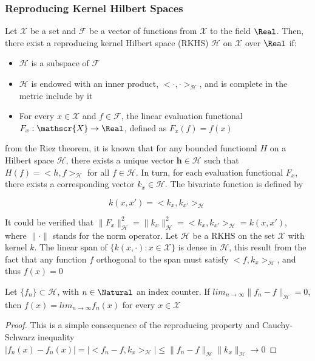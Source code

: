 \subsubsection{Reproducing Kernel Hilbert Spaces}

Let $\mathscr{X}$ be a set and $\mathscr{F}$ be a vector of functions from $\mathscr{X}$ to the field $\Real$. Then, there exist a reproducing kernel Hilbert space (RKHS) $\mathscr{H}$ on $\mathscr{X}$ over $\Real$ if:
\begin{itemize}
    \item $\mathscr{H}$ is a subspace of $\mathscr{F}$
    \item $\mathscr{H}$ is endowed with an inner product, $<\cdot,\cdot>_{\mathscr{H}}$, and is complete in the metric include by it
    \item For every $x \in \mathscr{X}$ and $f \in \mathscr{F}$, the linear evaluation functional $F_x:\mathscr{X} \rightarrow \Real$, defined as $F_x(f) = f(x)$
\end{itemize}

from the Riez theorem, it is known that for any bounded functional $H$ on a Hilbert space $\mathscr{H}$, there exists a unique vector $\mathbf{h} \in \mathscr{H}$ such that $H(f) = <h,f>_{\mathscr{H}}$ for all $f \in \mathscr{H}$. In turn, for each evaluation functional $F_x$, there exists a corresponding vector $k_x \in \mathscr{H}$. The bivariate function is defined by

\begin{equation}
    k(x,x') = <k_x,k_{x'}>_{\mathscr{H}}
\end{equation}

It could be verified that $\|F_x\|_{\mathscr{H}}^2 = \|k_x\|_{\mathscr{H}}^2 = <k_x,k_{x'}>_{\mathscr{H}} =k(x,x')$, where $\|\cdot\|$ stands for the norm operator. Let $\mathscr{H}$ be a RKHS on the set $\mathscr{X}$ with kernel $k$. The linear span of $\{k(x,\cdot):x\in \mathscr{X} \}$ is dense in $\mathscr{H}$, this result from the fact that any function $f$ orthogonal to the span must satisfy $<f,k_x>_{\mathscr{H}}$, and thus $f(x)=0$

\begin{lemm}
    Let $\{f_n\} \subset \mathscr{H}$, with $n \in \Natural$ an index counter. If $lim_{n \rightarrow \infty} \|f_n-f\|_\mathscr{H}=0$, then $f(x)=lim_{n \rightarrow \infty} f_n(x)$ for every $x \in \mathscr{X}$
\end{lemm}

\begin{proof}
This is a simple consequence of the reproducing property and Cauchy-Schwarz inequality $|f_n(x)-f_n(x)| = |<f_n-f,k_x>_{\mathscr{H}}| \leq \|f_n-f\|_{\mathscr{H}}\|k_x\|_{\mathscr{H}} \rightarrow 0$
\end{proof}

